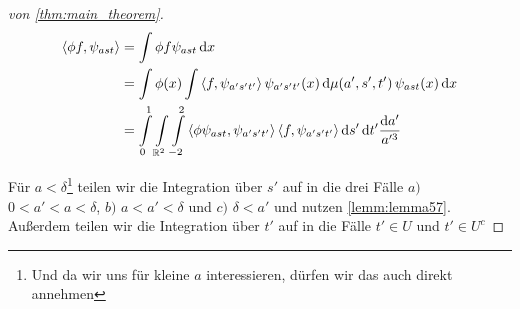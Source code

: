\begin{proof}[von \ref{thm:main_theorem}]
\begin{align*}
    \left\langle \phi f, \psi_{ast} \right\rangle
    &=
    \int \phi f \psi_{ast} \mathop{}\!\mathrm{d} x
    \\&=
    \int \phi(x) \int \left\langle f, \psi_{a' s' t'} \right\rangle
    \psi_{a's't'} (x) \mathop{}\!\mathrm{d} \mu(a',s',t') \,\psi_{ast}(x) \mathop{}\!\mathrm{d} x
    \\&=
    \int\limits_{0}^{1} \int\limits_{\mathbb{R}^2} \int\limits_{-2}^2
    \left\langle \phi \psi_{ast}, \psi_{a's't'} \right\rangle
    \left\langle f, \psi_{a's't'} \right\rangle
    \mathop{}\!\mathrm{d} s' \mathop{}\!\mathrm{d} t' \frac{\mathop{}\!\mathrm{d} a'}{a^{\prime 3}}
\end{align*}


Für $a < \delta$\footnote{Und da wir uns für kleine $a$ interessieren, dürfen wir das auch direkt annehmen} teilen wir die Integration über $s'$ auf in die drei Fälle $a)$ $0<a'<a<\delta$, $b)$ $a < a' < \delta$ und $c)$ $\delta < a'$ und nutzen \cref{lemm:lemma57}. Außerdem teilen wir die Integration über $t'$ auf in die Fälle $t' \in U$ und $t' \in U^c$


\end{proof}
